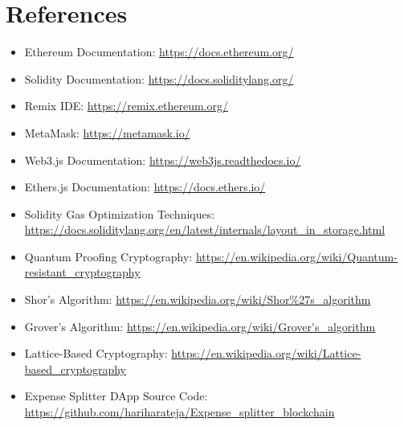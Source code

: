 \documentclass[12pt, a4paper]{article}
\begin{document}
\section{References}
\begin{itemize}
    \item Ethereum Documentation: \url{https://docs.ethereum.org/}
    \item Solidity Documentation: \url{https://docs.soliditylang.org/}
    \item Remix IDE: \url{https://remix.ethereum.org/}
    \item MetaMask: \url{https://metamask.io/}
    \item Web3.js Documentation: \url{https://web3js.readthedocs.io/}
    \item Ethers.js Documentation: \url{https://docs.ethers.io/}
    \item Solidity Gas Optimization Techniques: \url{https://docs.soliditylang.org/en/latest/internals/layout_in_storage.html}
    \item Quantum Proofing Cryptography: \url{https://en.wikipedia.org/wiki/Quantum-resistant_cryptography}
    \item Shor's Algorithm: \url{https://en.wikipedia.org/wiki/Shor%27s_algorithm}
    \item Grover's Algorithm: \url{https://en.wikipedia.org/wiki/Grover's_algorithm}
    \item Lattice-Based Cryptography: \url{https://en.wikipedia.org/wiki/Lattice-based_cryptography}
    \item Expense Splitter DApp Source Code: \url{https://github.com/hariharateja/Expense_splitter_blockchain}
\end{itemize} 
\end{document}
